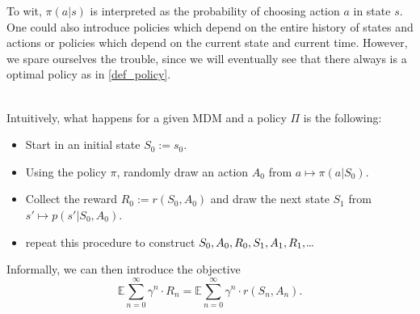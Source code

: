 To wit, \( \pi(a|s) \) is interpreted as the probability of choosing action \( a \) in state \( s \). One could also introduce  policies which depend on the entire history of states and actions or  policies which depend on the current state and current time.
However, we spare ourselves the trouble, since we will eventually see that there always is a  optimal policy as in \cref{def_policy}.


\ \\
Intuitively, what happens for a given MDM and a policy \( \Pi \) is the following:

\begin{itemize}
    \item Start in an initial state \( S_{0}:= s_{0} \).
    \item Using the policy \( \pi \), randomly draw an action \( A_{0} \) from \( a \mapsto \pi(a|S_{0}) \).
    \item Collect the reward \( R_{0} := r(S_{0}, A_{0})\) and draw the next state \( S_{1} \) from \( s' \mapsto p(s'|S_{0}, A_{0}) \).
    \item repeat this procedure to construct \( S_{0}, A_{0}, R_{0}, S_{1}, A_{1}, R_{1},\kern-0.10em.\kern-0.06em.\kern-0.06em.\kern-0.1em \) 
\end{itemize}

Informally, we can then introduce the objective
\[
    \mathbb{E} \sum_{n=0}^{\infty} \gamma^{n} \cdot R_n = \mathbb{E} \sum_{n=0}^{\infty} \gamma^{n} \cdot r(S_{n}, A_{n}).
\]





